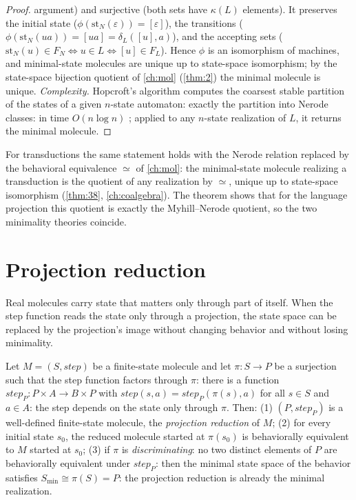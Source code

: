 \begin{proof}
argument) and surjective (both sets have $\kappa (L)$ elements). It preserves
the initial state ($\phi (\mathrm{st}_N (\varepsilon)) = [\varepsilon]$), the
transitions ($\phi (\mathrm{st}_N (ua)) = [ua] = \delta_L ([u], a)$), and the
accepting sets ($\mathrm{st}_N (u) \in F_N \Leftrightarrow u \in L
\Leftrightarrow [u] \in F_L$). Hence $\phi$ is an isomorphism of machines, and
minimal-state molecules are unique up to state-space isomorphism; by the
state-space bijection quotient of \autoref{ch:mol} (\autoref{thm:2}) the minimal molecule
is unique. \emph{Complexity.} Hopcroft's algorithm computes the coarsest
stable partition of the states of a given $n$-state automaton: exactly the
partition into Nerode classes: in time $O (n \log n)$ \cite{hopcroft};
applied to any $n$-state realization of $L$, it returns the minimal molecule.
\end{proof}

\begin{remark}
For transductions the same statement holds with the Nerode relation replaced
by the behavioral equivalence $\simeq$ of \autoref{ch:mol}: the minimal-state
molecule realizing a transduction is the quotient of any realization by
$\simeq$, unique up to state-space isomorphism (\autoref{thm:38}, \autoref{ch:coalgebra}).
The theorem shows that for the language projection this quotient is exactly
the Myhill--Nerode quotient, so the two minimality theories coincide.
\end{remark}

\section{Projection reduction}\label{sec:enrich-projection}

Real molecules carry state that matters only through part of itself. When the
step function reads the state only through a projection, the state space can
be replaced by the projection's image without changing behavior and without
losing minimality.

\begin{theorem}\label{thm:32}
 Let $M = (S, \mathit{step})$ be a finite-state molecule and
let $\pi \colon S \to P$ be a surjection such that the step function factors
through $\pi$: there is a function
$\mathit{step}_{P} \colon P \times A \to B \times P$ with
$\mathit{step} (s, a) = \mathit{step}_{P} (\pi (s), a)$ for all $s \in S$ and
$a \in A$: the step depends on the state only through $\pi$. Then:
(1) $(P, \mathit{step}_{P})$ is a well-defined finite-state molecule, the
\emph{projection reduction} of $M$;
(2) for every initial state $s_0$, the reduced molecule started at
$\pi (s_0)$ is behaviorally equivalent to $M$ started at $s_0$;
(3) if $\pi$ is \emph{discriminating}: no two distinct elements of $P$ are
behaviorally equivalent under $\mathit{step}_{P}$: then the minimal state
space of the behavior satisfies $S_{\min} \cong \pi (S) = P$: the projection
reduction is already the minimal realization.
\end{theorem}

